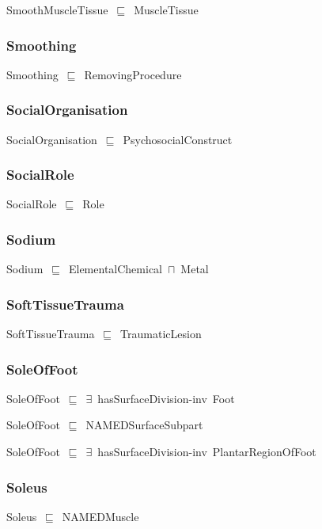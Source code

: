 \documentclass{article}
\begin{document}
SmoothMuscleTissue~\ensuremath{\sqsubseteq}~MuscleTissue~

\subsubsection*{Smoothing}

Smoothing~\ensuremath{\sqsubseteq}~RemovingProcedure~

\subsubsection*{SocialOrganisation}

SocialOrganisation~\ensuremath{\sqsubseteq}~PsychosocialConstruct~

\subsubsection*{SocialRole}

SocialRole~\ensuremath{\sqsubseteq}~Role~

\subsubsection*{Sodium}

Sodium~\ensuremath{\sqsubseteq}~ElementalChemical~\ensuremath{\sqcap}~Metal~

\subsubsection*{SoftTissueTrauma}

SoftTissueTrauma~\ensuremath{\sqsubseteq}~TraumaticLesion~

\subsubsection*{SoleOfFoot}

SoleOfFoot~\ensuremath{\sqsubseteq}~\ensuremath{\exists}~hasSurfaceDivision-inv~Foot~

SoleOfFoot~\ensuremath{\sqsubseteq}~NAMEDSurfaceSubpart~

SoleOfFoot~\ensuremath{\sqsubseteq}~\ensuremath{\exists}~hasSurfaceDivision-inv~PlantarRegionOfFoot~

\subsubsection*{Soleus}

Soleus~\ensuremath{\sqsubseteq}~NAMEDMuscle~
\end{document}
